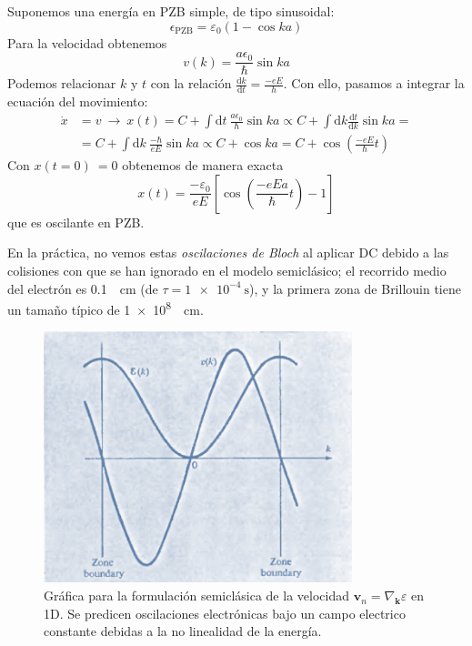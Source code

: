 \begin{boldproof}
  Suponemos una energía en PZB simple, de tipo sinusoidal:
    \begin{equation}
        \epsilon_\text{PZB} = \varepsilon_0 (1- \cos ka)
    \end{equation}
  Para la velocidad obtenemos
  \begin{equation}
    v(k) = \frac{a \epsilon_0}{\hbar} \sin ka
  \end{equation}
  Podemos relacionar $k$ y $t$ con la relación
  $\frac{\text{d}k}{\text{d}t}= \frac{-e E}{h}$. Con ello, pasamos a
  integrar la ecuación del movimiento:
  \begin{equation}
    \begin{split}
      \dot x &= v \ \rightarrow \ x(t) = C + \int \text{d}t \ \frac{a \epsilon_0}{\hbar}
      \sin ka \propto C + \int \text{d}k \frac{\text{d}t}{\text{d}k}
      \sin ka = \\ &= C + \int \text{d}k \ \frac{-\hbar}{eE} \sin ka
      \propto C + \cos ka = C + \cos(\frac{-eE}{\hbar} t)
    \end{split}
  \end{equation}
  Con $x(t=0) \ = 0$ obtenemos de manera exacta
    \begin{equation}
      x(t) = \frac{-\varepsilon_0}{eE} \left[
        \cos \left( \frac{-eEa}{\hbar}t  \right) -1\right]
    \end{equation}
  que es oscilante en PZB.
\end{boldproof}

En la práctica, no vemos estas \emph{oscilaciones de Bloch} al aplicar
DC debido a las colisiones con que se han ignorado en el modelo
semiclásico; el recorrido medio del electrón es
\SI{0.1}{\per\centi\metre} (de $\tau = \SI{1e-4}{\second}$), y la
primera zona de Brillouin tiene un tamaño típico de \SI{1e8}{\per\centi\metre}.

\begin{figure}
  \centering
  \includegraphics[width=0.8\textwidth]{figures/pzbv.png}
  \caption{Gráfica para la formulación semiclásica de la velocidad
    $\mathbf{v}_n = \nabla_\mathbf{k} \varepsilon$ en 1D. Se predicen oscilaciones
    electrónicas bajo un campo electrico constante debidas a la no
    linealidad de la energía.}
  \label{fig:pzbv}
\end{figure}


